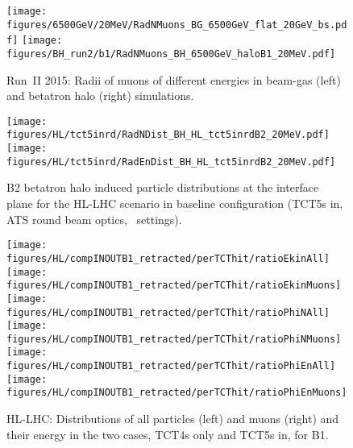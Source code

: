 \begin{figure}
\begin{center}
  \texttt{[image: figures/6500GeV/20MeV/RadNMuons\_BG\_6500GeV\_flat\_20GeV\_bs.pdf]}
  \texttt{[image: figures/BH\_run2/b1/RadNMuons\_BH\_6500GeV\_haloB1\_20MeV.pdf]}      
\end{center}
\vspace{-0.6cm}
 \caption{Run~II 2015: Radii of muons of different energies in beam-gas (left) and betatron halo (right) simulations.
  \label{fig:PhiEnMuComp}}
\end{figure}


\begin{figure}
\begin{center}
\texttt{[image: figures/HL/tct5inrd/RadNDist\_BH\_HL\_tct5inrdB2\_20MeV.pdf]}
\texttt{[image: figures/HL/tct5inrd/RadEnDist\_BH\_HL\_tct5inrdB2\_20MeV.pdf]}
\end{center}
\vspace{-0.6cm}
 \caption{B2 betatron halo induced particle distributions at the interface plane for the HL-LHC scenario in baseline configuration (TCT5s in, ATS round beam optics, \twosigmaret~settings).}
  \label{tct5inrdb2retr2}
\end{figure}



\begin{figure}
\centering
\texttt{[image: figures/HL/compINOUTB1\_retracted/perTCThit/ratioEkinAll]}
\texttt{[image: figures/HL/compINOUTB1\_retracted/perTCThit/ratioEkinMuons]}
\texttt{[image: figures/HL/compINOUTB1\_retracted/perTCThit/ratioPhiNAll]}
\texttt{[image: figures/HL/compINOUTB1\_retracted/perTCThit/ratioPhiNMuons]}
\texttt{[image: figures/HL/compINOUTB1\_retracted/perTCThit/ratioPhiEnAll]}
\texttt{[image: figures/HL/compINOUTB1\_retracted/perTCThit/ratioPhiEnMuons]}
 \caption{HL-LHC: Distributions of all particles (left) and muons (right) and their energy in the two cases, TCT4s only and TCT5s in, for B1.
  \label{fig:compInOutB1_perTCThit}}
\end{figure}




